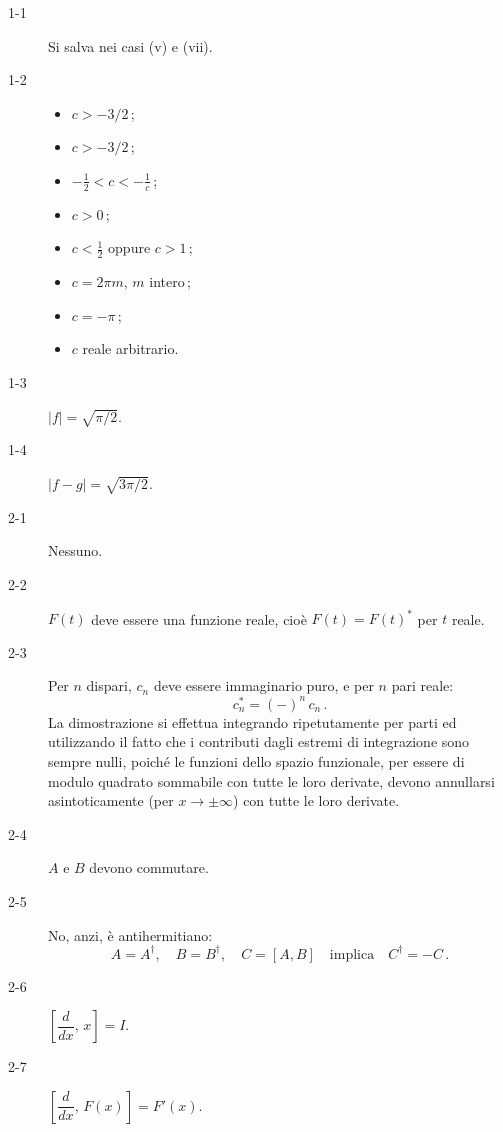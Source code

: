 \documentclass[11pt, a4paper]{book}
\numberwithin{equation}{section}
\begin{document}
\begin{description}
\item[1-1] Si salva nei casi (v) e (vii).

\item[1-2]
\begin{itemize}
  \item[(i)] $c > -3/2$\,;
  \item[(ii)] $c > -3/2$\,;
  \item[(iii)] $-\tfrac{1}{2} < c < -\tfrac{1}{c}$\,; %
  \item[(iv)] $c > 0$\,;
  \item[(v)] $c < \tfrac{1}{2}$ oppure $c > 1$\,;
  \item[(vi)] $c = 2\pi m$, $m$ intero\,;
  \item[(vii)] $c = -\pi$\,;
  \item[(viii)] $c$ reale arbitrario.
\end{itemize}

\item[1-3] $|f| = \sqrt{\pi/2}$.

\item[1-4] $|f - g| = \sqrt{3\pi/2}$.

\item[2-1] Nessuno.

\item[2-2] $F(t)$ deve essere una funzione reale, cioè $F(t) = F(t)^*$ per $t$ reale.

\item[2-3] Per $n$ dispari, $c_n$ deve essere immaginario puro, e per $n$ pari reale:
\[
  c_n^* = (-)^n\, c_n\,.
\]
La dimostrazione si effettua integrando ripetutamente per parti ed utilizzando il fatto che i contributi dagli estremi di integrazione sono sempre nulli, poiché le funzioni dello spazio funzionale, per essere di modulo quadrato sommabile con tutte le loro derivate, devono annullarsi asintoticamente (per $x \to \pm\infty$) con tutte le loro derivate.

\item[2-4] $A$ e $B$ devono commutare.

\item[2-5] No, anzi, è antihermitiano:
\[
  A = A^\dagger,\quad B = B^\dagger,\quad C = [A,B] \quad\text{implica}\quad C^\dagger = -C\,.
\]

\item[2-6] $\left[\dfrac{d}{dx},\, x\right] = I$.

\item[2-7] $\left[\dfrac{d}{dx},\, F(x)\right] = F'(x)$.


\end{description}
\end{document}
